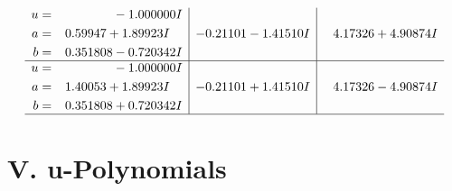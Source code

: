\documentclass[1p]{elsarticle_modified}
\theoremstyle{definition}
\begin{document}
$$\begin{array}{c|c|c}
\begin{aligned}
u &= \phantom{-0.000000 } -1.000000 I \\
a &= \phantom{-}0.59947 + 1.89923 I \\
b &= \phantom{-}0.351808 - 0.720342 I\end{aligned}
 & -0.21101 - 1.41510 I & \phantom{-}4.17326 + 4.90874 I \\ \hline\begin{aligned}
u &= \phantom{-0.000000 } -1.000000 I \\
a &= \phantom{-}1.40053 + 1.89923 I \\
b &= \phantom{-}0.351808 + 0.720342 I\end{aligned}
 & -0.21101 + 1.41510 I & \phantom{-}4.17326 - 4.90874 I\\
 \hline 
 \end{array}$$\newpage
\newpage\renewcommand{\arraystretch}{1}
\centering \section*{ V. u-Polynomials}
\end{document}
